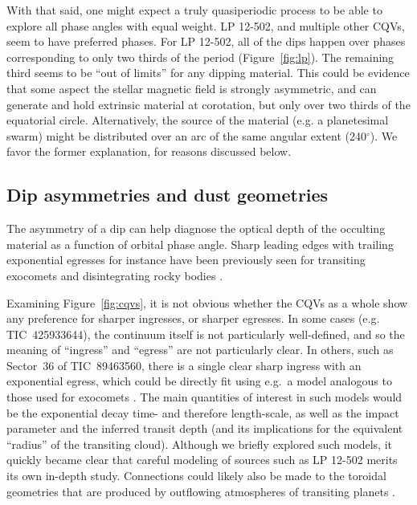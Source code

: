 \documentclass[11pt,twocolumn,tighten]{aastex63}
\begin{document}
With that said, one might expect a truly quasiperiodic process to be
able to explore all phase angles with equal weight.  LP 12-502, and
multiple other CQVs, seem to have preferred phases.  For LP 12-502, all of
the dips happen over phases corresponding to only two thirds of the
period (Figure~\ref{fig:lp}).  The remaining third seems to be ``out of limits'' for any dipping
material.  This could be evidence that some aspect the
stellar magnetic field is strongly asymmetric, and can generate and
hold extrinsic material at corotation, but only over two thirds of the
equatorial circle.  Alternatively, the source of the material (e.g. a planetesimal
swarm) might be distributed over an arc of the same angular extent (240$^\circ$).
We favor the
former explanation, for reasons discussed below.

\subsection{Dip asymmetries and dust geometries}
The asymmetry of a dip can help diagnose the optical depth of the
occulting material as a function of orbital phase angle.  Sharp
leading edges with trailing exponential egresses for instance have
been previously seen for transiting exocomets and disintegrating rocky
bodies
\citep[e.g.][]{2012ApJ...752....1R,2012A&A...545L...5B,2015Natur.526..546V,2019A&A...625L..13Z}.

Examining Figure~\ref{fig:cqvs}, it is not obvious
whether the CQVs as a whole show any preference for sharper ingresses,
or sharper egresses.
In some cases (e.g. TIC~425933644), the continuum itself is not
particularly well-defined, and so the meaning of ``ingress'' and
``egress'' are not particularly clear.
In others, such as Sector~36 of TIC~89463560, there is a single clear
sharp ingress with an exponential egress, which could be directly fit
using e.g.~a model analogous to those used for exocomets
\citep[e.g.][]{2019A&A...625L..13Z}.
The main quantities of interest in such models would be 
the exponential decay time- and therefore length-scale,
as well as the impact parameter and the 
inferred transit depth (and its implications for the equivalent
``radius'' of the transiting cloud).
Although we briefly explored such models, it quickly became clear that
careful modeling of sources such as LP 12-502 merits its own in-depth study.
Connections could likely also be made to the toroidal geometries that
are produced by outflowing atmospheres of transiting planets
\citep[e.g.][]{2019ApJ...873...89M,2022ApJ...926..226M}.
\end{document}

